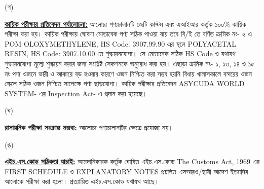 \documentclass[12pt]{article}
\begin{document}
\begin{minipage}[t]{0.05\linewidth}
\hspace{1em}
\end{minipage}
\begin{minipage}[t]{0.05\linewidth}
(গ)
\end{minipage}
\begin{minipage}[t]{0.90\linewidth}
\underline{\textbf{কায়িক পরীক্ষার প্রতিবেদন পর্যালোচনা:}}
আলোচ্য পণ্যচালানটি জেটি কাস্টম এবং এআইআর কর্তৃক ১০০\% কায়িক পরীক্ষা করা হয়।
কায়িক পরীক্ষায় ঘোষণা মোতাবেক পণ্য সঠিক পাওয়া যায় তবে বি/ই তে বর্ণিত ক্রমিক নং- ২ এ POM OLOXYMETHYLENE, HS Code: 3907.99.90 এর স্থলে POLYACETAL RESIN, HS Code: 3907.10.00 তে শুল্কায়নযোগ্য। সে মোতাবেক সঠিক HS Code ও যথাযথ শুল্কায়নযোগ্য মূল্যে শুল্কায়ন করার জন্য সংশ্লিষ্ট সেকশনকে অনুরোধ করা হয়। এছাড়া ক্রমিক নং- ১, ১৩, ১৪ ও ১৫ নং পণ্য ওজনে ভারী ও আকারে বড় হওয়ার কারণে ওজন নিশ্চিত করা সম্ভব হয়নি বিধায় খালাসকালে বন্দরের ওজন স্কেলে সঠিক ওজন নিশ্চিত সাপেক্ষে পণ্য ছাড়যোগ্য।
কায়িক পরীক্ষার প্রতিবেদন ASYCUDA WORLD SYSTEM- এর Inspection Act- এ প্রদান করা হয়েছে।
\\
\end{minipage}
\begin{minipage}[t]{0.05\linewidth}
\hspace{1em}
\end{minipage}
\begin{minipage}[t]{0.05\linewidth}
(ঘ)
\end{minipage}
\begin{minipage}[t]{0.90\linewidth}
\underline{\textbf{রাসায়নিক পরীক্ষা সংক্রান্ত মন্তব্য:}}
আলোচ্য পণ্যচালানটির ক্ষেত্রে প্রযোজ্য নয়।
\\
\end{minipage}
\begin{minipage}[t]{0.05\linewidth}
\hspace{1em}
\end{minipage}
\begin{minipage}[t]{0.05\linewidth}
(ঙ)
\end{minipage}
\begin{minipage}[t]{0.90\linewidth}
\underline{\textbf{এইচ.এস.কোড সঠিকতা যাচাই:}}
আমদানিকারক কর্তৃক ঘোষিত এইচ.এস.কোড The Customs Act, 1969 এর FIRST SCHEDULE ও
EXPLANATORY NOTES প্রচলিত এসআরও/স্থায়ী আদেশ ইত্যাদির আলোকে পরীক্ষা করা হলো।
প্রত্যায়িত এইচ.এস.কোড যথাযথ আছে।
\\
\end{minipage}
\begin{minipage}[t]{0.05\linewidth}
\hspace{1em}
\end{minipage}
\end{document}
